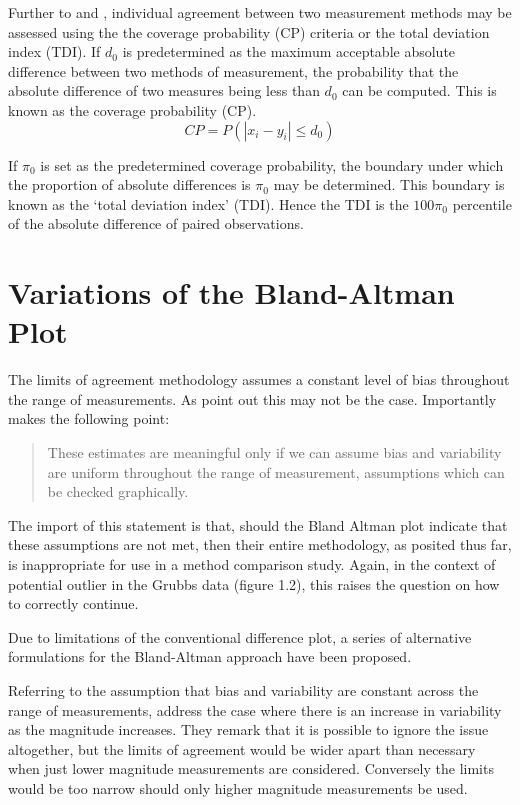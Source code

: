 \documentclass[12pt, a4paper]{report}
\theoremstyle{plain}
\theoremstyle{definition}
\theoremstyle{remark}
\begin{document}
Further to  \citet{lin2000} and \citet{lin2002}, individual agreement between two measurement methods may be
assessed using the the coverage probability (CP) criteria or the total deviation index (TDI). If $d_{0}$ is predetermined as the maximum acceptable absolute difference between two methods of measurement, the probability that the absolute difference of two measures being less than $d_{0}$ can be computed. This is known as the coverage probability (CP).
\begin{equation}
CP = P(|x_{i} - y_{i}| \leq d_{0})
\end{equation}

If $\pi_{0}$ is set as the predetermined coverage probability, the
boundary under which the proportion of absolute differences is
$\pi_{0}$ may be determined. This boundary is known as the `total
deviation index' (TDI). Hence the TDI is the $100\pi_{0}$
percentile of the absolute difference of paired observations.

\section{Variations of the Bland-Altman Plot} 
The limits of agreement methodology assumes a constant level of bias throughout the range of measurements. As \citet*{BA86} point out this may not be the case. 
Importantly \citet{BA99} makes the following point:
\begin{quote}These estimates are meaningful only if we can assume
	bias and variability are uniform throughout the range of
	measurement, assumptions which can be checked graphically.
\end{quote}

The import of this statement is that, should the Bland Altman plot indicate that these assumptions are not met, then their
entire methodology, as posited thus far, is inappropriate for use
in a method comparison study. Again, in the context of potential
outlier in the Grubbs data (figure 1.2), this raises the question
on how to correctly continue. 

Due to limitations of the conventional difference plot, a series of alternative formulations for the Bland-Altman approach have been proposed.

Referring to the assumption that bias and variability are constant across the range of measurements, \citet{BA99} address the case where there is an increase in variability as the magnitude increases. They remark that it is possible to ignore the issue altogether, but the limits of agreement would be wider apart than necessary when just lower magnitude measurements are considered. Conversely the limits would be too narrow should only higher magnitude measurements be used. 
\end{document}

